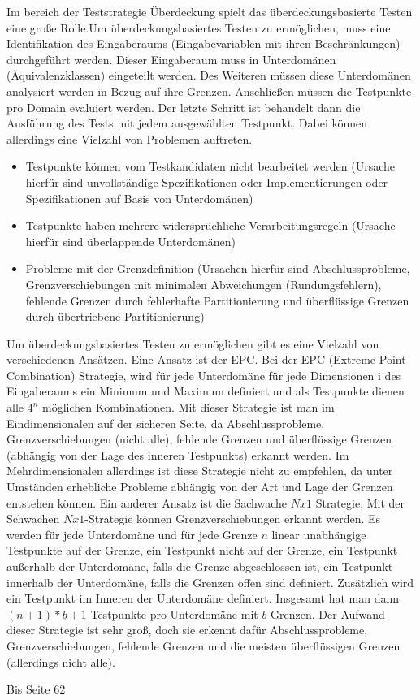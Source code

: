 Im bereich der Teststrategie Überdeckung spielt das überdeckungsbasierte Testen eine große Rolle.Um überdeckungsbasiertes Testen zu ermöglichen, muss eine Identifikation des  Eingaberaums (Eingabevariablen mit ihren Beschränkungen) durchgeführt werden. Dieser Eingaberaum muss in Unterdomänen (Äquivalenzklassen) eingeteilt werden. Des Weiteren müssen diese Unterdomänen analysiert werden in Bezug auf ihre Grenzen. Anschließen müssen die Testpunkte pro Domain evaluiert werden.
Der letzte Schritt ist behandelt dann die Ausführung des Tests mit jedem ausgewählten Testpunkt. Dabei können allerdings eine Vielzahl von Problemen auftreten.
\begin{itemize}
\item Testpunkte können vom Testkandidaten nicht bearbeitet werden (Ursache hierfür sind unvollständige Spezifikationen oder Implementierungen oder Spezifikationen auf Basis von Unterdomänen)
\item Testpunkte haben mehrere widersprüchliche Verarbeitungsregeln (Ursache hierfür sind überlappende Unterdomänen)
\item Probleme mit der Grenzdefinition (Ursachen hierfür sind Abschlussprobleme, Grenzverschiebungen mit minimalen Abweichungen (Rundungsfehlern), fehlende Grenzen durch fehlerhafte Partitionierung und überflüssige Grenzen durch übertriebene Partitionierung)
\end{itemize}

Um überdeckungsbasiertes Testen zu ermöglichen gibt es eine Vielzahl von verschiedenen Ansätzen.
Eine Ansatz ist der EPC. Bei der EPC (Extreme Point Combination) Strategie, wird für jede Unterdomäne für jede Dimensionen i des Eingaberaums ein Minimum und Maximum definiert und als Testpunkte dienen alle $4^n$ möglichen Kombinationen. 
Mit dieser Strategie ist man im Eindimensionalen auf der sicheren Seite, da Abschlussprobleme, Grenzverschiebungen (nicht alle), fehlende Grenzen und überflüssige Grenzen (abhängig von der Lage des inneren Testpunkts) erkannt werden. Im Mehrdimensionalen allerdings ist diese Strategie nicht zu empfehlen, da unter Umständen erhebliche Probleme abhängig von der Art und Lage der Grenzen entstehen können.
\linebreak
Ein anderer Ansatz ist die Sachwache $Nx1$ Strategie. Mit der Schwachen $Nx1$-Strategie können Grenzverschiebungen erkannt werden. Es werden für jede Unterdomäne und für jede Grenze $n$ linear unabhängige Testpunkte auf der Grenze, ein Testpunkt nicht auf der Grenze, ein Testpunkt außerhalb der Unterdomäne, falls die Grenze abgeschlossen ist, ein Testpunkt innerhalb der Unterdomäne, falls die Grenzen offen sind definiert. Zusätzlich wird ein Testpunkt im Inneren der Unterdomäne definiert. Insgesamt hat man dann $(n+1)*b+1$ Testpunkte pro Unterdomäne mit $b$ Grenzen. Der Aufwand dieser Strategie ist sehr groß, doch sie erkennt dafür Abschlussprobleme, Grenzverschiebungen, fehlende Grenzen und die meisten überflüssigen Grenzen (allerdings nicht alle).

Bis Seite 62